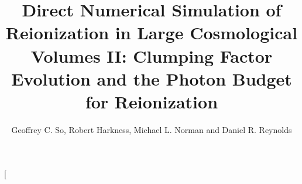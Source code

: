 \documentclass[letterpaper,10pt]{article}
\author{Geoffrey C. So, Robert Harkness, Michael L. Norman and Daniel R. Reynolds}
\title{Direct Numerical Simulation of Reionization in Large
  Cosmological Volumes II: Clumping Factor Evolution and the Photon
  Budget for Reionization}
\renewcommand{\(}{\left(}
\renewcommand{\)}{\right)}
\begin{document}
\twocolumn[
\maketitle
\begin{@twocolumnfalse}
\begin{abstract}




\end{abstract}
\end{@twocolumnfalse}
\end{document}
